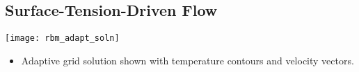 \subsection*{Surface-Tension-Driven Flow}
\begin{frame}[t]
  \begin{center}
    \texttt{[image: rbm\_adapt\_soln]}    
  \end{center}

  \begin{block}{}
    \begin{itemize}
    \item{Adaptive grid solution shown
      with temperature contours and velocity vectors.
      }
      \end{itemize}
  \end{block}
\end{frame}

